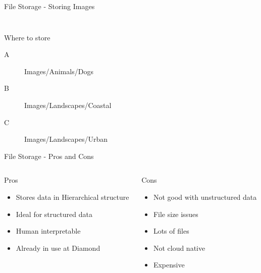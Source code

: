 \begin{frame}{File Storage - Storing Images}
\begin{columns}
\begin{column}{0.47\textwidth}
\begin{figure}
        \label{fig:my_label}
    \end{figure}
    \end{column}
\end{columns} 
\begin{block}{Where to store}
\begin{description}
    \item [A] Images/Animals/Dogs
    \item [B] Images/Landscapes/Coastal
    \item [C] Images/Landscapes/Urban
\end{description}
\end{block}
\end{frame}


\begin{frame}{File Storage - Pros and Cons}
\begin{columns}[t]
    \begin{column}{0.47\textwidth}
    \begin{block}{Pros}
        \begin{itemize}
            \item Stores data in  Hierarchical structure
            \item Ideal for structured data
            \item Human interpretable 
            \item Already in use at Diamond
        \end{itemize}
    \end{block}
    \end{column}
    \begin{column}{0.47\textwidth}
    \begin{block}{Cons}
        \begin{itemize}
            \item Not good with unstructured data
            \item File size issues
            \item Lots of files
            \item Not cloud native
            \item Expensive
        \end{itemize}
    \end{block}
    \end{column}
\end{columns}
\end{frame}

